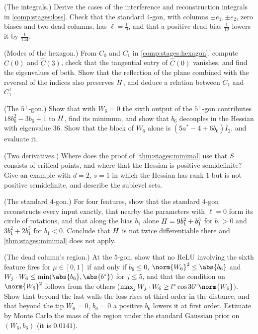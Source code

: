 \begin{refsection}
\begin{exercises}
\item \consolidation (The integrals.) Derive the cases of the interference and reconstruction integrals in \cref{comp:stages:loss}. Check that the standard $4$-gon, with columns $\pm e_1,\pm e_2$, zero biases and two dead columns, has $\ell=\frac19$, and that a positive dead bias $\frac1{12}$ lowers it by $\frac1{144}$.\label{ex:stages:integrals}

\item \consolidation (Modes of the hexagon.) From $C_0$ and $C_1$ in \cref{comp:stages:hexagon}, compute $\hat C(0)$ and $\hat C(3)$, check that the tangential entry of $\hat C(0)$ vanishes, and find the eigenvalues of both. Show that the reflection of the plane combined with the reversal of the indices also preserves $H$, and deduce a relation between $C_1$ and $C_1^\top$.\label{ex:stages:modes}

\item \consolidation (The $5^+$-gon.) Show that with $W_6=0$ the sixth output of the $5^+$-gon contributes $18b_6^2-3b_6+1$ to $H$, find its minimum, and show that $b_6$ decouples in the Hessian with eigenvalue $36$. Show that the block of $W_6$ alone is $(5a^*-4+6b_6)I_2$, and evaluate it.\label{ex:stages:fiveplus}

\item \consolidation (Two derivatives.) Where does the proof of \cref{thm:stages:minimal} use that $S$ consists of critical points, and where that the Hessian is positive semidefinite? Give an example with $d=2$, $s=1$ in which the Hessian has rank $1$ but is not positive semidefinite, and describe the sublevel sets.\label{ex:stages:hypotheses}

\item \byhand (The standard $4$-gon.) For four features, show that the standard $4$-gon reconstructs every input exactly, that nearby the parameters with $\ell=0$ form its circle of rotations, and that along the bias $b_1$ alone $H=9b_1^2+b_1^3$ for $b_1>0$ and $3b_1^2+2b_1^3$ for $b_1<0$. Conclude that $H$ is not twice differentiable there and \cref{thm:stages:minimal} does not apply.\label{ex:stages:fourgon}

\item \byhand (The dead column's region.) At the $5$-gon, show that no ReLU involving the sixth feature fires for $\mu\in[0,1]$ if and only if $b_6\le0$, $\norm{W_6}^2\le\abs{b_6}$ and $W_j\cdot W_6\le\min(\abs{b_6},\abs{b^*})$ for $j\le5$, and that the condition on $\norm{W_6}^2$ follows from the others ($\max_jW_j\cdot W_6\ge l^*\cos36^\circ\norm{W_6}$). Show that beyond the last walls the loss rises at third order in the distance, and that beyond the tip $W_6=0$, $b_6=0$ a positive $b_6$ lowers it at first order. Estimate by Monte Carlo the mass of the region under the standard Gaussian prior on $(W_6,b_6)$ (it is $0.0141$).\label{ex:stages:region}


\end{exercises}
\end{refsection}
